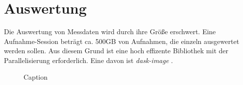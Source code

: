 \chapter{Auswertung}
Die Auswertung von Messdaten wird durch ihre Größe erschwert. Eine Aufnahme-Session beträgt ca. 500GB von Aufnahmen, die einzeln ausgewertet werden sollen. Aus diesem Grund ist eine hoch effizente Bibliothek mit der Parallelisierung erforderlich. Eine davon ist \textit{dask-image} \cite{dask-library}.
\begin{figure}[H]
    \centering
    
    \caption{Caption}
    \label{fig:my_label}
\end{figure}
